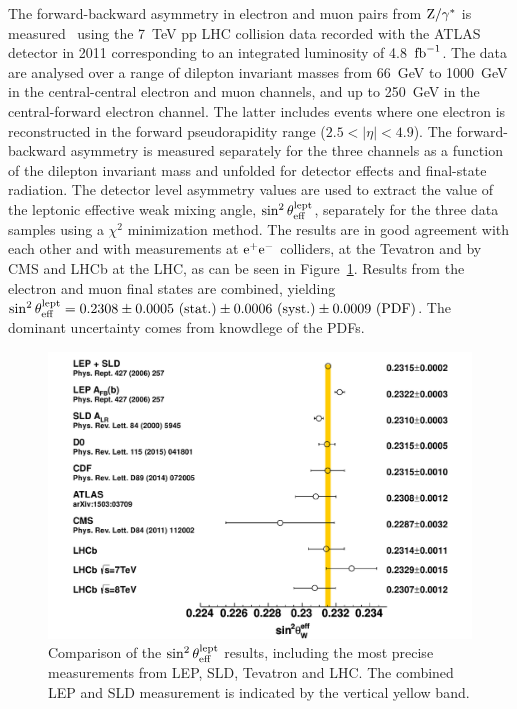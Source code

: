 \documentclass{blois}
\begin{document}
The forward-backward asymmetry in electron and muon pairs from ${\rm Z}/\gamma^*$
is measured~\cite{ref:ATLAS-fb-asymmetry} using the 7~TeV pp LHC collision data
recorded with the ATLAS detector in 2011 corresponding to an integrated luminosity
of 4.8~${\rm fb}^{-1}$. The data are analysed over a range of dilepton invariant
masses from 66~GeV to 1000~GeV in the central-central electron and muon channels,
and up to 250~GeV in the central-forward electron channel. The latter includes
events where one electron is reconstructed in the forward pseudorapidity range
($2.5 < |\eta| < 4.9$). The forward-backward asymmetry is measured separately
for the three channels as a function of the dilepton invariant mass and unfolded
for detector effects and final-state radiation. The detector level asymmetry
values are used to extract the value of the leptonic effective weak mixing angle,
$\sin^2\theta_{\rm eff}^{\rm lept}$, separately for the three data samples using
a $\chi^2$ minimization method. The results are in good agreement with each other
and with measurements at ${\rm e}^+{\rm e}^-$ colliders, at the Tevatron and by
CMS and LHCb at the LHC, as can be seen in Figure~\ref{fig:sin2theta}. Results
from the electron and muon final states are combined, yielding
$\sin^2\theta_{\rm eff}^{\rm lept} = 0.2308 \pm 0.0005~({\rm stat.}) \pm 0.0006~({\rm syst.}) \pm 0.0009~({\rm PDF})$.
The dominant uncertainty comes from knowdlege of the PDFs.
%
\begin{figure}
\centerline{\includegraphics[width=0.9\linewidth]{figures/stw_comp_fullref_final}}
\caption[]{Comparison of the $\sin^2\theta_{\rm eff}^{\rm lept}$ results, including
the most precise measurements from LEP, SLD, Tevatron and LHC. The combined LEP and
SLD measurement is indicated by the vertical yellow band.}
\label{fig:sin2theta}
\end{figure}
\end{document}
